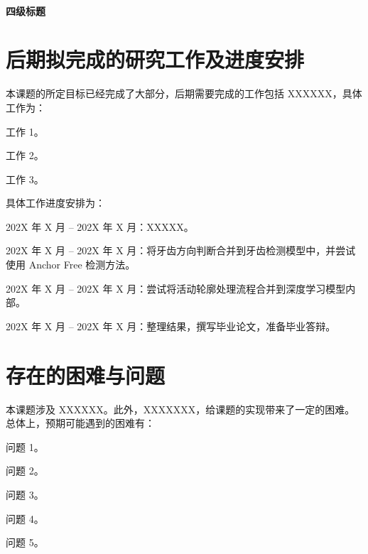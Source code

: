 \paragraph{四级标题}
\lipsum[3]

\section{后期拟完成的研究工作及进度安排}

本课题的所定目标已经完成了大部分，后期需要完成的工作包括 XXXXXX，具体工作为：
\begin{semiQuotList}
    \item 工作 1。
    \item 工作 2。
    \item 工作 3。
\end{semiQuotList}

具体工作进度安排为：
\begin{closeItemize}
    \item 202X 年 X 月 -- 202X 年 X 月：XXXXX。
    \item 202X 年 X 月 -- 202X 年 X 月：将牙齿方向判断合并到牙齿检测模型中，并尝试使用 Anchor Free 检测方法。
    \item 202X 年 X 月 -- 202X 年 X 月：尝试将活动轮廓处理流程合并到深度学习模型内部。
    \item 202X 年 X 月 -- 202X 年 X 月：整理结果，撰写毕业论文，准备毕业答辩。
\end{closeItemize}

\section{存在的困难与问题}
本课题涉及 XXXXXX。此外，XXXXXXX，给课题的实现带来了一定的困难。总体上，预期可能遇到的困难有：
\begin{semiQuotList}
    \item 问题 1。
    \item 问题 2。
    \item 问题 3。
    \item 问题 4。
    \item 问题 5。
\end{semiQuotList}

